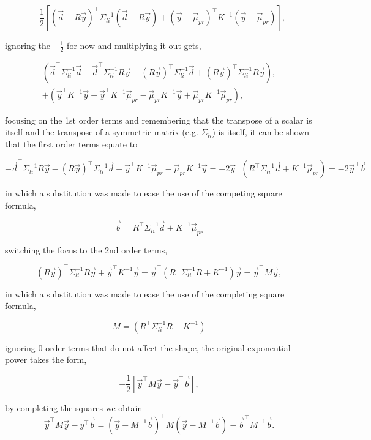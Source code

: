 $$
 -\frac{1}{2}\left[(\vec d - R\vec y)^{\top} \Sigma^{-1}_{li} (\vec d - R\vec y)  + (\vec y - \vec \mu_{pr})^{\top} K^{-1} (\vec y - \vec \mu_{pr})\right],
$$

\noindent ignoring the $-\frac{1}{2}$ for now and multiplying it out gets,

\begin{multline*}
\left(\vec d ^\top \Sigma_{li}^{-1} \vec d - \vec d^\top \Sigma_{li}^{-1} R\vec y - (R\vec y)^\top \Sigma_{li}^{-1} \vec d + (R\vec y)^\top \Sigma_{li}^{-1} R\vec y \right), \\ 
+ \left( \vec y^\top K^{-1} \vec y - \vec y^\top K^{-1} \vec \mu_{pr} - \vec \mu_{pr}^\top K^{-1} \vec y + \vec \mu_{pr}^\top K^{-1} \vec \mu_{pr} \right),
\end{multline*}

\noindent focusing on the 1st order terms and remembering that the transpose of a scalar is itself and the transpose of a symmetric matrix (e.g. $\Sigma_{li}$) is itself, it can be shown that the first order terms equate to

$$
- \vec d^\top \Sigma_{li}^{-1} R\vec y - (R\vec y)^\top \Sigma_{li}^{-1} \vec d - \vec y^\top K^{-1} \vec \mu_{pr} - \vec \mu_{pr}^\top K^{-1} \vec y = -2 \vec y^\top ( R^{\top} \Sigma_{li}^{-1}\vec d + K^{-1} \vec \mu_{pr}) =-2 \vec y^\top \vec b
$$

\noindent in which a substitution was made to ease the use of the competing square formula, 

$$
\vec b = R^{\top} \Sigma_{li}^{-1}\vec d + K^{-1} \vec \mu_{pr}
$$

\noindent switching the focus to the 2nd order terms,

$$
(R\vec y)^\top \Sigma_{li}^{-1} R\vec y + \vec y^\top K^{-1} \vec y = \vec y^\top (R^\top \Sigma_{li}^{-1} R + K^{-1}) \vec y = \vec y^\top M \vec y,
$$

\noindent in which a substitution was made to ease the use of the completing square formula,

$$
M = (R^\top \Sigma_{li}^{-1} R + K^{-1})
$$

\noindent ignoring 0 order terms that do not affect the shape, the original exponential power takes the form,

$$
 -\frac{1}{2}\left[\vec y^\top M \vec y - \vec y^\top \vec b \right],
$$

\noindent by completing the squares we obtain
$$
\vec y^\top M \vec y - y^\top \vec b = (\vec y - M^{-1}\vec b)^\top M (\vec y - M^{-1} \vec b) - \vec b^\top M^{-1} \vec b.
$$

